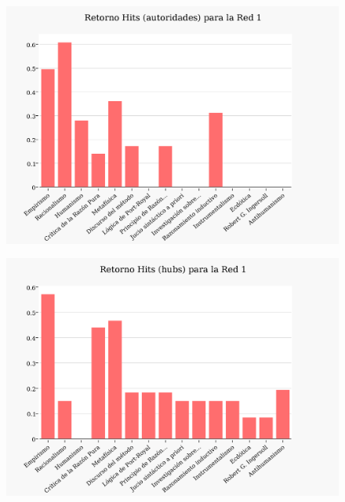 \documentclass[a4paper]{article}
\begin{document}
\begin{figure}
  \begin{center}
	\includegraphics[scale=0.66]{imagenes/Exp1/hitsA1}
	\label{hitsa1}
  \end{center}
\end{figure}

\begin{figure}
  \begin{center}
	\includegraphics[scale=0.66]{imagenes/Exp1/hitsH1}
	\label{hitsh1}
  \end{center}
\end{figure}
\end{document}
